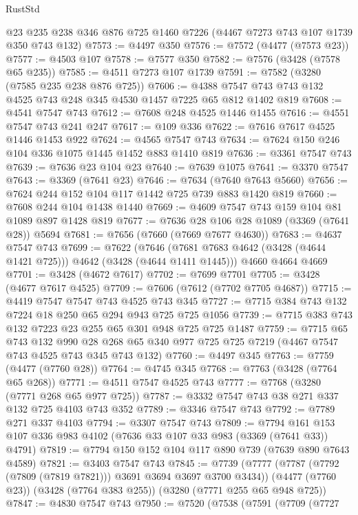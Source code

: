 \begin{lexlean}{RustStd}
\begin{coremodule}
    @23
    @235
    @238
    @346
    @876
    @725
    @1460
    @7226
    (@4467 @7273 @743 @107 @1739 @350 @743 @132)
@7573 := @4497 @350
@7576 := @7572 (@4477 (@7573 @23))
@7577 := @4503 @107
@7578 := @7577 @350
@7582 := @7576 (@3428 (@7578 @65 @235))
@7585 := @4511 @7273 @107 @1739
@7591 := @7582 (@3280 (@7585 @235 @238 @876 @725))
@7606 := @4388 @7547 @743 @743 @132 @4525 @743 @248 @345 @4530 @1457 @7225 @65 @812 @1402 @819
@7608 := @4541 @7547 @743
@7612 := @7608 @248 @4525 @1446 @1455
@7616 := @4551 @7547 @743 @241 @247
@7617 := @109 @336
@7622 := @7616 @7617 @4525 @1446 @1453 @922
@7624 := @4565 @7547 @743
@7634 := @7624 @150 @246 @104 @336 @1075 @1445 @1452 @883 @1410 @819
@7636 := @3361 @7547 @743
@7639 := @7636 @23 @104 @23
@7640 := @7639 @1075
@7641 := @3370 @7547
@7643 := @3369 (@7641 @23)
@7646 := @7634 (@7640 @7643 @5660)
@7656 := @7624 @244 @152 @104 @117 @1442 @725 @739 @883 @1420 @819
@7660 := @7608 @244 @104 @1438 @1440
@7669 := @4609 @7547 @743 @159 @104 @81 @1089 @897 @1428 @819
@7677 := @7636 @28 @106 @28 @1089 (@3369 (@7641 @28)) @5694
@7681 := @7656 (@7660 (@7669 @7677 @4630))
@7683 := @4637 @7547 @743
@7699 := @7622
    (@7646 (@7681 @7683 @4642 (@3428 (@4644 @1421 @725))) @4642 (@3428 (@4644 @1411 @1445)))
    @4660
    @4664
    @4669
@7701 := @3428 (@4672 @7617)
@7702 := @7699 @7701
@7705 := @3428 (@4677 @7617 @4525)
@7709 := @7606 (@7612 (@7702 @7705 @4687))
@7715 := @4419 @7547 @7547 @743 @4525 @743 @345
@7727 := @7715 @384 @743 @132 @7224 @18 @250 @65 @294 @943 @725 @725 @1056
@7739 := @7715 @383 @743 @132 @7223 @23 @255 @65 @301 @948 @725 @725 @1487
@7759 := @7715
    @65
    @743
    @132
    @990
    @28
    @268
    @65
    @340
    @977
    @725
    @725
    @7219
    (@4467 @7547 @743 @4525 @743 @345 @743 @132)
@7760 := @4497 @345
@7763 := @7759 (@4477 (@7760 @28))
@7764 := @4745 @345
@7768 := @7763 (@3428 (@7764 @65 @268))
@7771 := @4511 @7547 @4525 @743
@7777 := @7768 (@3280 (@7771 @268 @65 @977 @725))
@7787 := @3332 @7547 @743 @38 @271 @337 @132 @725 @4103 @743 @352
@7789 := @3346 @7547 @743
@7792 := @7789 @271 @337 @4103
@7794 := @3307 @7547 @743
@7809 := @7794 @161 @153 @107 @336 @983 @4102 (@7636 @33 @107 @33 @983 (@3369 (@7641 @33)) @4791)
@7819 := @7794 @150 @152 @104 @117 @890 @739 (@7639 @890 @7643 @4589)
@7821 := @3403 @7547 @743
@7845 := @7739
    (@7777 (@7787 (@7792 (@7809 (@7819 @7821))) @3691 @3694 @3697 @3700 @3434))
    (@4477 (@7760 @23))
    (@3428 (@7764 @383 @255))
    (@3280 (@7771 @255 @65 @948 @725))
@7847 := @4830 @7547 @743
@7950 := @7520
    (@7538
      (@7591
        (@7709
          (@7727

\end{coremodule}
\end{lexlean}
